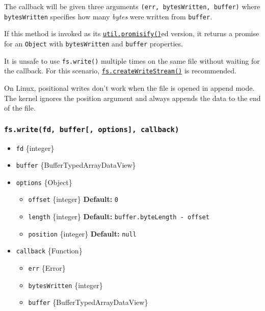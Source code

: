 The callback will be given three arguments
\texttt{(err,\ bytesWritten,\ buffer)} where \texttt{bytesWritten}
specifies how many \emph{bytes} were written from \texttt{buffer}.

If this method is invoked as its
\href{util.md\#utilpromisifyoriginal}{\texttt{util.promisify()}}ed
version, it returns a promise for an \texttt{Object} with
\texttt{bytesWritten} and \texttt{buffer} properties.

It is unsafe to use \texttt{fs.write()} multiple times on the same file
without waiting for the callback. For this scenario,
\hyperref[fscreatewritestreampath-options]{\texttt{fs.createWriteStream()}}
is recommended.

On Linux, positional writes don't work when the file is opened in append
mode. The kernel ignores the position argument and always appends the
data to the end of the file.

\subsubsection{\texorpdfstring{\texttt{fs.write(fd,\ buffer{[},\ options{]},\ callback)}}{fs.write(fd, buffer{[}, options{]}, callback)}}\label{fs.writefd-buffer-options-callback}

\begin{itemize}
\tightlist
\item
  \texttt{fd} \{integer\}
\item
  \texttt{buffer} \{Buffer\textbar TypedArray\textbar DataView\}
\item
  \texttt{options} \{Object\}

  \begin{itemize}
  \tightlist
  \item
    \texttt{offset} \{integer\} \textbf{Default:} \texttt{0}
  \item
    \texttt{length} \{integer\} \textbf{Default:}
    \texttt{buffer.byteLength\ -\ offset}
  \item
    \texttt{position} \{integer\} \textbf{Default:} \texttt{null}
  \end{itemize}
\item
  \texttt{callback} \{Function\}

  \begin{itemize}
  \tightlist
  \item
    \texttt{err} \{Error\}
  \item
    \texttt{bytesWritten} \{integer\}
  \item
    \texttt{buffer} \{Buffer\textbar TypedArray\textbar DataView\}
  \end{itemize}
\end{itemize}

